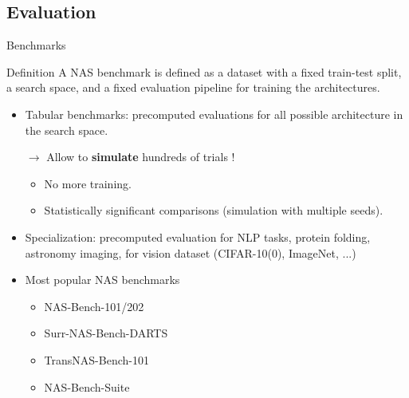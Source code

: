 \documentclass[aspectratio=169,xcolor=dvipsnames]{beamer}
\begin{document}
\subsection{Evaluation}
\begin{frame}{Benchmarks}
    \begin{block}{Definition}
        A NAS benchmark is defined as a dataset with a fixed train-test split, a search space, and a fixed evaluation pipeline for training the architectures.
    \end{block}
    \begin{itemize}
        \item Tabular benchmarks: precomputed evaluations for all possible architecture in the search space.
        \item [$\rightarrow$] Allow to \textbf{simulate} hundreds of trials !\begin{itemize}
                  \item No more training.
                  \item Statistically significant comparisons (simulation with multiple seeds).
              \end{itemize}
        \item Specialization: precomputed evaluation for NLP tasks, protein folding, astronomy imaging, for vision dataset (CIFAR-10(0), ImageNet, ...)
        \item Most popular NAS benchmarks \begin{itemize}
                  \item NAS-Bench-101/202
                  \item Surr-NAS-Bench-DARTS
                  \item TransNAS-Bench-101
                  \item NAS-Bench-Suite
              \end{itemize}
    \end{itemize}
\end{frame}
\end{document}
